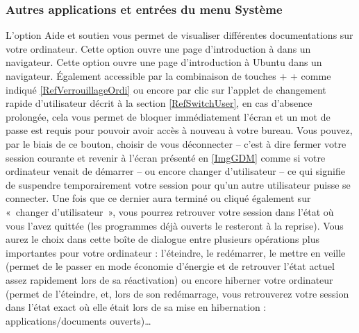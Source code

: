 \subsubsection{Autres applications et entrées du menu Système}
L'option Aide et soutien vous permet de visualiser différentes documentations sur votre ordinateur.
Cette option ouvre une page d'introduction à  dans un navigateur.
Cette option ouvre une page d'introduction à Ubuntu dans un navigateur.
Également accessible par la combinaison de touches  +  +  comme indiqué \ref{RefVerrouillageOrdi} ou encore par clic sur l'applet de changement rapide d'utilisateur décrit à la section \ref{RefSwitchUser}, en cas d'absence prolongée, cela vous permet de bloquer immédiatement l'écran et un mot de passe est requis pour pouvoir avoir accès à nouveau à votre bureau.
Vous pouvez, par le biais de ce bouton, choisir de vous déconnecter -- c'est à dire fermer votre session courante et revenir à l'écran présenté en \ref{ImgGDM} comme si votre ordinateur venait de démarrer -- ou encore changer d'utilisateur -- ce qui signifie de suspendre temporairement votre session pour qu'un autre utilisateur puisse se connecter. Une fois que ce dernier aura terminé ou cliqué également sur «~changer d'utilisateur~», vous pourrez retrouver votre session dans l'état où vous l'avez quittée (les programmes déjà ouverts le resteront à la reprise).
Vous aurez le choix dans cette boîte de dialogue entre plusieurs opérations plus importantes pour votre ordinateur : l'éteindre, le redémarrer, le mettre en veille (permet de le passer en mode économie d'énergie et de retrouver l'état actuel assez rapidement lors de sa réactivation) ou encore hiberner votre ordinateur (permet de l'éteindre, et, lors de son redémarrage, vous retrouverez votre session dans l'état exact où elle était lors de sa mise en hibernation : applications/documents ouverts)\ldots{}
